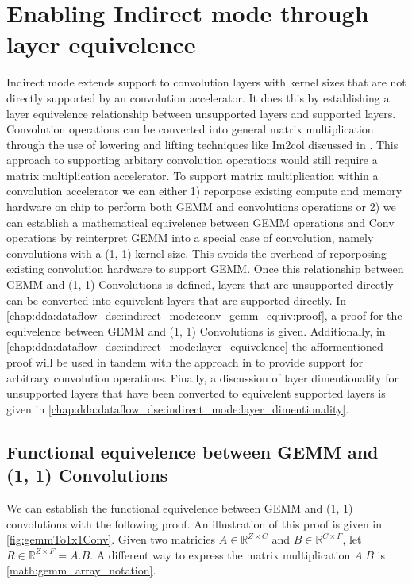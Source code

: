 \clearpage 

\section{Enabling Indirect mode through layer equivelence}
\label{chap:dda:dataflow_dse:indirect_mode}

Indirect mode extends support to convolution layers with kernel sizes that are
not directly supported by an convolution accelerator. It does this by
establishing a layer equivelence relationship between unsupported layers and
supported layers. Convolution operations can be converted into general matrix
multiplication through the use of lowering and lifting techniques like Im2col
discussed in \cite{cafe_con_troll}. This approach to supporting arbitary
convolution operations would still require a matrix multiplication accelerator.
To support matrix multiplication within a convolution accelerator we can either
1) reporpose existing compute and memory hardware on chip to perform both GEMM
and convolutions operations or 2) we can establish a mathematical equivelence
between GEMM operations and Conv operations by reinterpret GEMM into a special
case of convolution, namely convolutions with a (1, 1) kernel size. This avoids the
overhead of reporposing existing convolution hardware to support GEMM. Once this
relationship between GEMM and (1, 1) Convolutions is defined, layers that are
unsupported directly can be converted into equivelent layers that are supported
directly. In
\autoref{chap:dda:dataflow_dse:indirect_mode:conv_gemm_equiv:proof}, a proof for
the equivelence between GEMM and (1, 1) Convolutions is given. Additionally, in
\autoref{chap:dda:dataflow_dse:indirect_mode:layer_equivelence} the
afformentioned proof will be used in tandem with the approach in
\cite{cafe_con_troll} to provide support for arbitrary convolution operations.
Finally, a discussion of layer dimentionality for unsupported layers that have
been converted to equivelent supported layers is given in
\autoref{chap:dda:dataflow_dse:indirect_mode:layer_dimentionality}.  

\clearpage

\subsection{Functional equivelence between GEMM and (1, 1) Convolutions}
\label{chap:dda:dataflow_dse:indirect_mode:conv_gemm_equiv:proof}

We can establish the functional equivelence between GEMM and (1, 1) convolutions with
the following proof. An illustration of this proof is given in
\autoref{fig:gemmTo1x1Conv}.  
Given two matricies $A\in \mathbb{R}^{Z \times C}$ and $B \in \mathbb{R}^{C
\times F}$, let $R \in \mathbb{R}^{Z\times F} = A.B$. A different way to express
the matrix multiplication $A.B$ is \autoref{math:gemm_array_notation}.  

